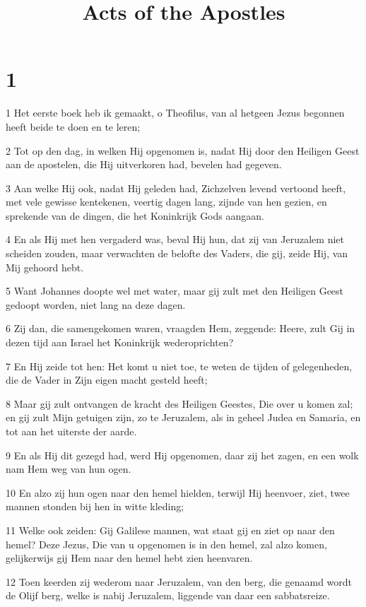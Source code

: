 

\title{Acts of the Apostles}



\chapter{1}

\par 1 Het eerste boek heb ik gemaakt, o Theofilus, van al hetgeen Jezus begonnen heeft beide te doen en te leren;
\par 2 Tot op den dag, in welken Hij opgenomen is, nadat Hij door den Heiligen Geest aan de apostelen, die Hij uitverkoren had, bevelen had gegeven.
\par 3 Aan welke Hij ook, nadat Hij geleden had, Zichzelven levend vertoond heeft, met vele gewisse kentekenen, veertig dagen lang, zijnde van hen gezien, en sprekende van de dingen, die het Koninkrijk Gods aangaan.
\par 4 En als Hij met hen vergaderd was, beval Hij hun, dat zij van Jeruzalem niet scheiden zouden, maar verwachten de belofte des Vaders, die gij, zeide Hij, van Mij gehoord hebt.
\par 5 Want Johannes doopte wel met water, maar gij zult met den Heiligen Geest gedoopt worden, niet lang na deze dagen.
\par 6 Zij dan, die samengekomen waren, vraagden Hem, zeggende: Heere, zult Gij in dezen tijd aan Israel het Koninkrijk wederoprichten?
\par 7 En Hij zeide tot hen: Het komt u niet toe, te weten de tijden of gelegenheden, die de Vader in Zijn eigen macht gesteld heeft;
\par 8 Maar gij zult ontvangen de kracht des Heiligen Geestes, Die over u komen zal; en gij zult Mijn getuigen zijn, zo te Jeruzalem, als in geheel Judea en Samaria, en tot aan het uiterste der aarde.
\par 9 En als Hij dit gezegd had, werd Hij opgenomen, daar zij het zagen, en een wolk nam Hem weg van hun ogen.
\par 10 En alzo zij hun ogen naar den hemel hielden, terwijl Hij heenvoer, ziet, twee mannen stonden bij hen in witte kleding;
\par 11 Welke ook zeiden: Gij Galilese mannen, wat staat gij en ziet op naar den hemel? Deze Jezus, Die van u opgenomen is in den hemel, zal alzo komen, gelijkerwijs gij Hem naar den hemel hebt zien heenvaren.
\par 12 Toen keerden zij wederom naar Jeruzalem, van den berg, die genaamd wordt de Olijf berg, welke is nabij Jeruzalem, liggende van daar een sabbatsreize.
